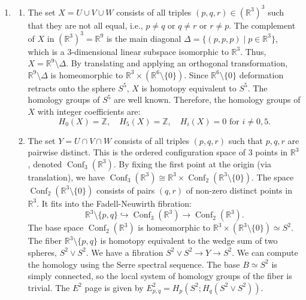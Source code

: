 \documentclass{article}
\begin{document}
\begin{enumerate}[label=\fbox{\arabic*}]
  \item %
        \begin{enumerate}[label=(\arabic*)]
          \item The set $X = U \cup V \cup W$ consists of all triples $(p, q, r) \in (\mathbb{R}^3)^3$ such that they are not all equal, i.e., $p \neq q$ or $q \neq r$ or $r \neq p$. 
          The complement of $X$ in $(\mathbb{R}^3)^3 = \mathbb{R}^9$ is the main diagonal $\Delta = \{ (p, p, p) \mid p \in \mathbb{R}^3 \}$, which is a 3-dimensional linear subspace isomorphic to $\mathbb{R}^3$.
          Thus, $X = \mathbb{R}^9 \setminus \Delta$. By translating and applying an orthogonal transformation, $\mathbb{R}^9 \setminus \Delta$ is homeomorphic to $\mathbb{R}^3 \times (\mathbb{R}^6 \setminus \{0\})$.
          Since $\mathbb{R}^6 \setminus \{0\}$ deformation retracts onto the sphere $S^5$, $X$ is homotopy equivalent to $S^5$.
          The homology groups of $S^5$ are well known. Therefore, the homology groups of $X$ with integer coefficients are:
          \[
            H_0(X) = \mathbb{Z}, \quad H_5(X) = \mathbb{Z}, \quad H_i(X) = 0 \text{ for } i \neq 0, 5.
          \]
          \item The set $Y = U \cap V \cap W$ consists of all triples $(p, q, r)$ such that $p, q, r$ are pairwise distinct. This is the ordered configuration space of 3 points in $\mathbb{R}^3$, denoted $\operatorname{Conf}_3(\mathbb{R}^3)$.
          By fixing the first point at the origin (via translation), we have $\operatorname{Conf}_3(\mathbb{R}^3) \cong \mathbb{R}^3 \times \operatorname{Conf}_2(\mathbb{R}^3 \setminus \{0\})$.
          The space $\operatorname{Conf}_2(\mathbb{R}^3 \setminus \{0\})$ consists of pairs $(q, r)$ of non-zero distinct points in $\mathbb{R}^3$. It fits into the Fadell-Neuwirth fibration:
          \[
            \mathbb{R}^3 \setminus \{p, q\} \hookrightarrow \operatorname{Conf}_3(\mathbb{R}^3) \to \operatorname{Conf}_2(\mathbb{R}^3).
          \]
          The base space $\operatorname{Conf}_2(\mathbb{R}^3)$ is homeomorphic to $\mathbb{R}^3 \times (\mathbb{R}^3 \setminus \{0\}) \simeq S^2$.
          The fiber $\mathbb{R}^3 \setminus \{p, q\}$ is homotopy equivalent to the wedge sum of two spheres, $S^2 \vee S^2$.
          We have a fibration $S^2 \vee S^2 \to Y \to S^2$. We can compute the homology using the Serre spectral sequence. 
          The base $B \simeq S^2$ is simply connected, so the local system of homology groups of the fiber is trivial.
          The $E^2$ page is given by $E^2_{p, q} = H_p(S^2; H_q(S^2 \vee S^2))$.

\end{enumerate}
\end{enumerate}
\end{document}
